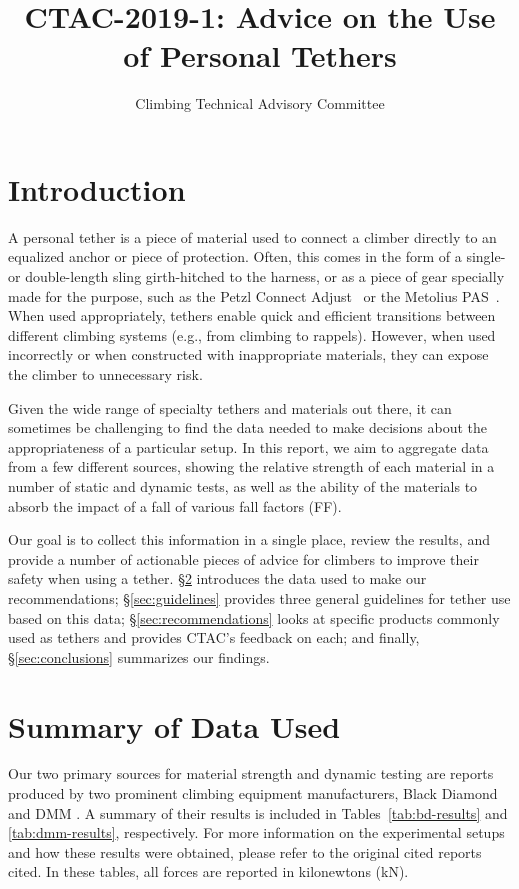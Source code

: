 \documentclass[nonacm,acmtog]{acmart}
\title{CTAC-2019-1: Advice on the Use of Personal Tethers}
\subtitle{Climbing Technical Advisory Committee}
\begin{document}
\maketitle

\section{Introduction}
\label{sec:intro}

   A personal tether is a piece of material used to connect a climber directly
   to an equalized anchor or piece of protection.  Often, this comes in the form
   of a single- or double-length sling girth-hitched to the harness, or as a
   piece of gear specially made for the purpose, such as the Petzl Connect
   Adjust~\cite{gear:connect} or the Metolius PAS~\cite{gear:pas}.  When used
   appropriately, tethers enable quick and efficient transitions between
   different climbing systems (e.g., from climbing to rappels).  However, when
   used incorrectly or when constructed with inappropriate materials, they can
   expose the climber to unnecessary risk.

   Given the wide range of specialty tethers and materials out there, it can
   sometimes be challenging to find the data needed to make decisions about the
   appropriateness of a particular setup.  In this report, we aim to aggregate
   data from a few different sources, showing the relative strength of each
   material in a number of static and dynamic tests, as well as the ability of
   the materials to absorb the impact of a fall of various fall factors (FF).

   Our goal is to collect this information in a single place, review the
   results, and provide a number of actionable pieces of advice for climbers to
   improve their safety when using a tether.  \S\ref{sec:studies} introduces
   the data used to make our recommendations; \S\ref{sec:guidelines} provides
   three general guidelines for tether use based on this data;
   \S\ref{sec:recommendations} looks at specific products commonly used as
   tethers and provides CTAC's feedback on each; and finally,
   \S\ref{sec:conclusions} summarizes our findings.

\section{Summary of Data Used}
\label{sec:studies}

   Our two primary sources for material strength and dynamic testing are
   reports produced by two prominent climbing equipment manufacturers, Black
   Diamond \cite{bd-pull-tests} and DMM \cite{dmm-pull-tests}.  A summary of
   their results is included in Tables~\ref{tab:bd-results} and
   \ref{tab:dmm-results}, respectively.  For more information on the
   experimental setups and how these results were obtained, please refer to the
   original cited reports cited.  In these tables, all forces are reported in
   kilonewtons (kN).
\end{document}
